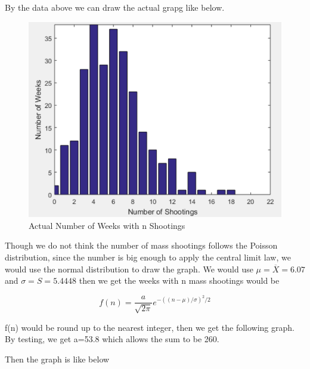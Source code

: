 \documentclass{article}
\begin{document}
By the data above we can draw the actual grapg like below.

\begin{figure}[H]
\begin{center}
\includegraphics[width=17cm]{actual.png}
\caption{Actual Number of Weeks with n Shootings}
\end{center}
\end{figure}

Though we do not think the number of mass shootings follows the Poisson distribution, since the number is big enough to apply the central limit law, we would use the normal distribution to draw the graph.  We would use $\mu=\overline X=6.07$ and $\sigma=S=5.4448$ then we get the weeks with n mass shootings would be

$$f(n)=\frac{a}{\sqrt{2\pi}}e^{-((n-\mu)/\sigma)^2/2}$$

f(n) would be round up to the nearest integer, then we get the following graph. By testing, we get a=53.8 which allows the sum to be 260.

Then the graph is like below
\end{document}
